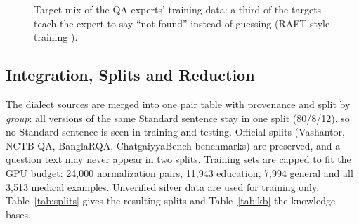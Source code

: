 \begin{figure}[!t]
\centering
{}
\caption{Target mix of the QA experts' training data: a third of the targets teach the expert to say ``not found'' instead of guessing (RAFT-style training \cite{zhang2024raft}).}
\label{fig:mix}
\end{figure}

\subsection{Integration, Splits and Reduction}
The dialect sources are merged into one pair table with provenance and split by \emph{group}: all versions of the same Standard sentence stay in one split (80/8/12), so no Standard sentence is seen in training and testing. Official splits (Vashantor, NCTB-QA, BanglaRQA, ChatgaiyyaBench benchmarks) are preserved, and a question text may never appear in two splits. Training sets are capped to fit the GPU budget: 24,000 normalization pairs, 11,943 education, 7,994 general and all 3,513 medical examples. Unverified silver data are used for training only. Table~\ref{tab:splits} gives the resulting splits and Table~\ref{tab:kb} the knowledge bases.

